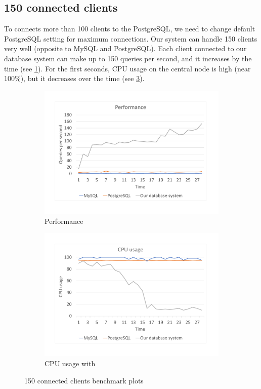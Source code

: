 \subsection{150 connected clients}
To connects more than 100 clients to the PostgreSQL, we need to change  default PostgreSQL setting for maximum connections. Our system can handle 150 clients very well (opposite to MySQL and PostgreSQL). Each client connected to our database system can make up to 150 queries per second, and it increases by the time (see \ref{bench150per}). For the first seconds, CPU usage on the central node is high (near 100\%), but it decreases over the time (see \ref{bench150cpu}).

\begin{figure}[h]
    \begin{subfigure}{.5\textwidth}
        \centering
        \includegraphics[trim={1.78cm 2cm 2.08cm 1cm},clip,width=1.0\linewidth]{excel/150per.pdf}
        \caption{Performance}
        \label{bench150per}
    \end{subfigure}
    \begin{subfigure}{.5\textwidth}
        \centering
        \includegraphics[trim={1.78cm 2cm 2.08cm 1cm},clip,width=1.0\linewidth]{excel/150cpu.pdf}
        \caption{CPU usage with}
        \label{bench150cpu}
    \end{subfigure}
    \caption{150 connected clients benchmark plots}
\end{figure}

